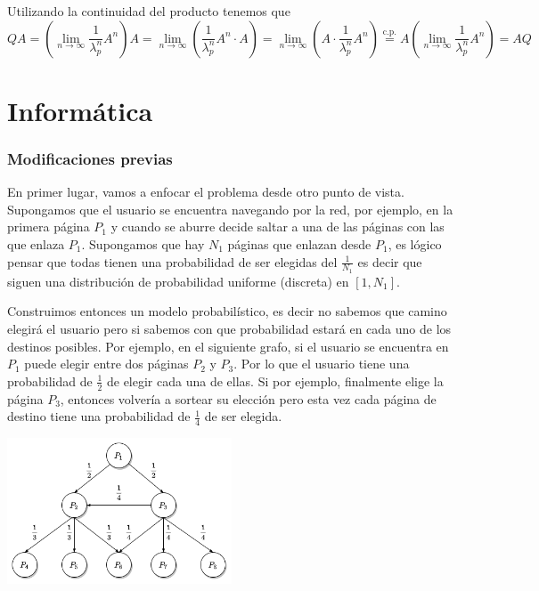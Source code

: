 \documentclass[size=a4, parskip=half, titlepage=false, toc=flat, toc=bib, 12pt]{scrartcl}
\makeatletter
\renewenvironment{proof}[1][\proofname] {\par\pushQED{\qed}\normalfont\topsep6\p@\@plus6\p@\relax\trivlist\item[\hskip\labelsep\itshape\tgpaella#1\@addpunct{.}]\ignorespaces}{\popQED\endtrivlist\@endpefalse}
\theoremstyle{theorem-style}
\theoremstyle{definition-style}
\theoremstyle{remark-style}
\theoremstyle{example-style}
\theoremstyle{definition-style}
\theoremstyle{remark-style}
\makeatother
\begin{document}
\begin{proof}
\begin{itemize}
Utilizando la continuidad del producto tenemos que
$$QA = (\lim_{n \to \infty} \frac{1}{\lambda_p^n} A^n)A = \lim_{n \to \infty} (\frac{1}{\lambda_p^n} A^n \cdot A) = \lim_{n \to \infty} (A \cdot \frac{1}{\lambda_p^n} A^n) \overset{\textrm{c.p.}} = A ( \lim_{n \to \infty} \frac{1}{\lambda_p^n} A^n) = AQ$$

\end{itemize}
\end{proof}



\newpage

\part{Informática}

\section{Modificaciones previas}

En primer lugar, vamos a enfocar el problema desde otro punto de vista. Supongamos que el usuario se encuentra navegando por la red, por ejemplo, en la primera página $P_1$ y cuando se aburre decide saltar a una de las páginas con las que enlaza $P_1$. Supongamos que hay $N_1$ páginas que enlazan desde $P_1$, es lógico pensar que todas tienen una probabilidad de ser elegidas del $\frac{1}{N_1}$ es decir que siguen una distribución de probabilidad uniforme (discreta) en $[1, N_1]$.

Construimos entonces un modelo probabilístico, es decir no sabemos que camino elegirá el usuario pero si sabemos con que probabilidad estará en cada uno de los destinos posibles. Por ejemplo, en el siguiente grafo, si el usuario se encuentra en $P_1$ puede elegir entre dos páginas $P_2$ y $P_3$. Por lo que el usuario tiene una probabilidad de $\frac{1}{2}$ de elegir cada una de ellas. Si por ejemplo, finalmente elige la página $P_3$, entonces volvería a sortear su elección pero esta vez cada página de destino tiene una probabilidad de $\frac{1}{4}$ de ser elegida.

\begin{center}
\includegraphics[width=0.5\textwidth]{./img/grafoprob}
\end{center}
\end{document}
